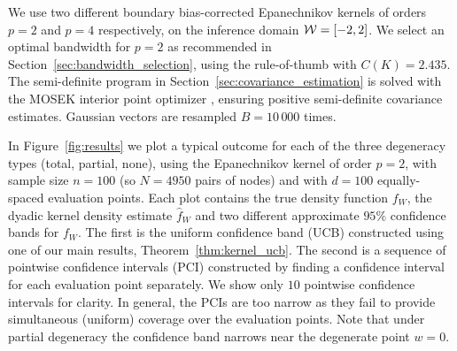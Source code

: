 We use two different boundary bias-corrected Epanechnikov kernels of orders
$p=2$ and $p=4$ respectively, on the inference domain $\mathcal{W} = [-2,2]$. We select
an optimal bandwidth for $p=2$ as recommended in
Section~\ref{sec:bandwidth_selection}, using the rule-of-thumb with
$C(K) = 2.435$. The semi-definite program in
Section~\ref{sec:covariance_estimation} is solved with the MOSEK interior point
optimizer \citep{mosek}, ensuring positive semi-definite covariance estimates.
Gaussian vectors are resampled $B = 10\,000$ times.

In Figure~\ref{fig:results} we plot a typical outcome for each of the three
degeneracy types (total, partial, none), using the Epanechnikov kernel of order
$p=2$, with sample size $n=100$ (so $N=4950$ pairs of nodes) and with $d=100$
equally-spaced evaluation points. Each plot contains the true density function
$f_W$, the dyadic kernel density estimate $\hat f_W$ and two different
approximate $95\%$ confidence bands for $f_W$. The first is the uniform
confidence band (UCB) constructed using one of our main results,
Theorem~\ref{thm:kernel_ucb}. The second is a sequence of pointwise confidence
intervals (PCI) constructed by finding a confidence interval for each
evaluation point separately. We show only $10$ pointwise confidence intervals
for clarity. In general, the PCIs are too narrow as they fail to provide
simultaneous (uniform) coverage over the evaluation points. Note that under
partial degeneracy the confidence band narrows near the degenerate point
$w = 0$.

